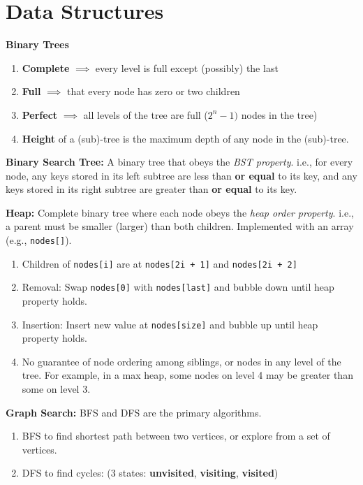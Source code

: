\documentclass[12pt]{article}
\begin{document}
\section{Data Structures}
\noindent
\textbf{Binary Trees}
\begin{enumerate}
\item \textbf{Complete} $\implies$ every level is full except (possibly) the last
\item \textbf{Full} $\implies$ that every node has zero or two children
\item \textbf{Perfect} $\implies$ all levels of the tree are full ($2^n-1)$ nodes in the tree) 
\item \textbf{Height} of a (sub)-tree is the maximum depth of any node in the (sub)-tree. 
\end{enumerate}

\vspace{5mm}
\noindent
\textbf{Binary Search Tree:}
A binary tree that obeys the \emph{BST property}. i.e., for every node, any keys stored
in its left subtree are less than \textbf{or equal} to its key, and any keys stored in its
right subtree are greater than \textbf{or equal} to its key.


\vspace{5mm}
\noindent
\textbf{Heap:}
Complete binary tree where each node obeys the \emph{heap order property}.
i.e., a parent must be smaller (larger) than both children.
Implemented with an array (e.g., \texttt{nodes[]}).
\begin{enumerate}
\item Children of \texttt{nodes[i]} are at \texttt{nodes[2i + 1]} and \texttt{nodes[2i + 2]}
\item Removal: Swap \texttt{nodes[0]} with \texttt{nodes[last]} and bubble down until heap property holds.
\item Insertion: Insert new value at \texttt{nodes[size]} and bubble up until heap property holds.
\item No guarantee of node ordering among siblings, or nodes in any level of the tree. For example, in a max heap, some nodes on level 4 may be greater than some on level 3.
\end{enumerate}

\vspace{5mm}
\noindent
\textbf{Graph Search:}
BFS and DFS are the primary algorithms.
\begin{enumerate}
\item BFS to find shortest path between two vertices, or explore from a set of vertices.
\item DFS to find cycles: (3 states: \textbf{unvisited}, \textbf{visiting}, \textbf{visited})
\end{enumerate}
\end{document}
